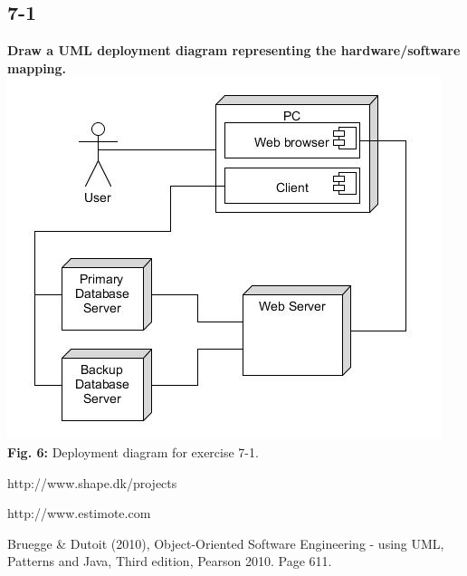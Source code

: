 \documentclass[12pt]{article}
\begin{document}
\newpage
\subsection{7-1}
\textbf{Draw a UML deployment diagram representing the hardware/software mapping.}\\

\includegraphics[scale=0.7]{7-1}\\
\textbf{Fig. 6:} Deployment diagram for exercise 7-1.










\newpage
\begin{thebibliography}{9}

http://www.shape.dk/projects

http://www.estimote.com
  
Bruegge \& Dutoit (2010), Object-Oriented Software Engineering - using UML, Patterns and Java, Third edition, Pearson 2010. Page 611.

\end{thebibliography}
\end{document}
